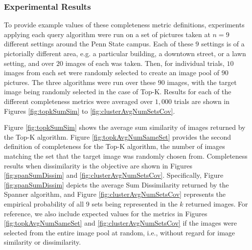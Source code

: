 \subsubsection{Experimental Results}

%

To provide example values of these completeness metric definitions, experiments applying each query algorithm were run on a set of pictures taken at $n = 9$ different settings around the Penn State campus.  Each of these $9$ settings is of a pictorially different area, e.g. a particular building, a downtown street, or a lawn setting, and over $20$ images of each was taken.  Then, for individual trials, $10$ images from each set were randomly selected to create an image pool of $90$ pictures.  The three algorithms were run over these $90$ images, with the target image being randomly selected in the case of Top-K.  Results for each of the different completeness metrics were averaged over $1,000$ trials are shown in Figures \ref{fig:topkSumSim} to \ref{fig:clusterAvgNumSetsCov}.

Figure \ref{fig:topkSumSim} shows the average sum similarity of images returned by the Top-K algorithm.  Figure \ref{fig:topkAvgNumSameSet} provides the second definition of completeness for the Top-K algorithm, the number of images matching the set that the target image was randomly chosen from.  
Completeness results when dissimilarity is the objective are shown in Figures \ref{fig:spanSumDissim} and \ref{fig:clusterAvgNumSetsCov}.  Specifically, Figure \ref{fig:spanSumDissim} depicts the average Sum Dissimilarity returned by the Spanner algorithm, and 
Figure \ref{fig:clusterAvgNumSetsCov} represents the empirical probability of all $9$ sets being represented in the $k$ returned images.   For reference, we also include expected values for the metrics in Figures \ref{fig:topkAvgNumSameSet} and \ref{fig:clusterAvgNumSetsCov} if the images were selected from the entire image pool at random, i.e., without regard for image similarity or dissimilarity.  

